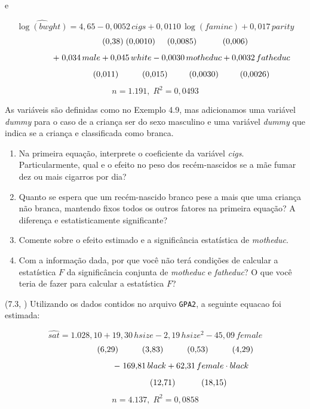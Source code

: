 \documentclass[12pt,letterpaper, onecolumn]{exam}
\begin{document}
\begin{questions}
e

\[
\widehat{\log(bwght)} = 4{,}65 - 0{,}0052\,cigs + 0{,}0110\,\log(faminc) + 0{,}017\,parity
\]
\[
\hspace{1.7cm} (0{,}38)\;(0{,}0010)\hspace{0.5cm}(0{,}0085)\hspace{1.1cm}(0{,}006)
\]
\[
\hspace{1.4cm} +\; 0{,}034\,male + 0{,}045\,white - 0{,}0030\,motheduc + 0{,}0032\,fatheduc
\]
\[
\hspace{2.2cm} (0{,}011)\hspace{1.0cm}(0{,}015)\hspace{0.9cm}(0{,}0030)\hspace{0.9cm}(0{,}0026)
\]
\[
n = 1{.}191,\; R^2 = 0{,}0493
\]

As variáveis são definidas como no Exemplo 4.9, mas adicionamos uma variável \textit{dummy} para o caso de a criança ser do sexo masculino e uma variável \textit{dummy} que indica se a criança e classificada como branca.
\begin{enumerate}[label=(\roman*)]
    \item Na primeira equação, interprete o coeficiente da variável \textit{cigs}. Particularmente, qual e o efeito no peso dos recém-nascidos se a mãe fumar dez ou mais cigarros por dia?
    \item Quanto se espera que um recém-nascido branco pese a mais que uma criança não branca, mantendo fixos todos os outros fatores na primeira equação? A diferença e estatisticamente significante?
    \item Comente sobre o efeito estimado e a significância estatística de \textit{motheduc}.
    \item Com a informação dada, por que você não terá condições de calcular a estatística \(F\) da significância conjunta de \textit{motheduc} e \textit{fatheduc}? O que você teria de fazer para calcular a estatística \(F\)?
\end{enumerate}

\vspace{0.7cm}

\question\qstar  (7.3, \citep{wooldridge2016}) Utilizando os dados contidos no arquivo \texttt{GPA2}, a seguinte equacao foi estimada:

\[
\widehat{sat} = 1{.}028{,}10 + 19{,}30\,hsize - 2{,}19\,hsize^2 - 45{,}09\,female
\]
\[
\hspace{1.7cm} (6{,}29)\hspace{1.0cm}(3{,}83)\hspace{1.0cm}(0{,}53)\hspace{1.0cm}(4{,}29)
\]
\[
\hspace{2.2cm} -\; 169{,}81\,black + 62{,}31\,female \cdot black
\]
\[
\hspace{2.8cm} (12{,}71)\hspace{1.1cm}(18{,}15)
\]
\[
n = 4{.}137,\; R^2 = 0{,}0858
\]


\end{questions}
\end{document}
